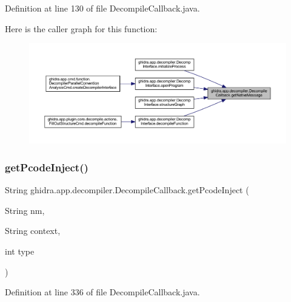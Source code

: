 Definition at line 130 of file Decompile\+Callback.\+java.

Here is the caller graph for this function\+:
\nopagebreak
\begin{figure}[H]
\begin{center}
\leavevmode
\includegraphics[width=350pt]{classghidra_1_1app_1_1decompiler_1_1_decompile_callback_a10df9c572093e669a18123a5acb361eb_icgraph}
\end{center}
\end{figure}
\mbox{\label{classghidra_1_1app_1_1decompiler_1_1_decompile_callback_a190b9fe1770fb3c9100dd88653820023}} 
\subsubsection{\texorpdfstring{getPcodeInject()}{getPcodeInject()}}
{\footnotesize\ttfamily String ghidra.\+app.\+decompiler.\+Decompile\+Callback.\+get\+Pcode\+Inject (\begin{DoxyParamCaption}\item[{String}]{nm,  }\item[{String}]{context,  }\item[{int}]{type }\end{DoxyParamCaption})\hspace{0.3cm}{\ttfamily [inline]}}



Definition at line 336 of file Decompile\+Callback.\+java.

